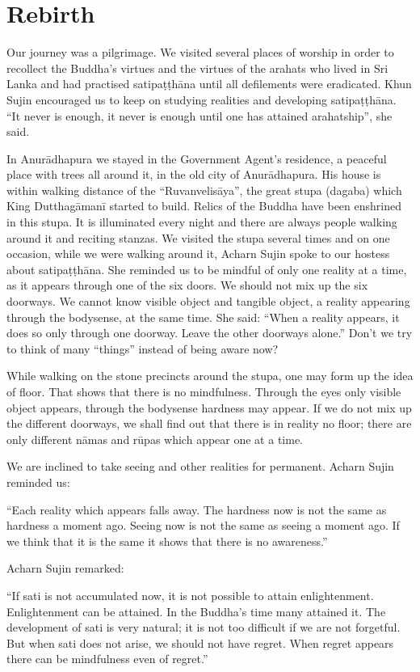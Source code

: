 \section*{Rebirth}

Our journey was a pilgrimage. We visited several places of worship in
order to recollect the Buddha's virtues and the virtues of the arahats
who lived in Sri Lanka and had practised satipaṭṭhāna until all
defilements were eradicated. Khun Sujin encouraged us to keep on
studying realities and developing satipaṭṭhāna. ``It never is enough, it
never is enough until one has attained arahatship'', she said.

In Anurādhapura we stayed in the Government Agent's residence, a
peaceful place with trees all around it, in the old city of
Anurādhapura. His house is within walking distance of the
``Ruvanvelisāya'', the great stupa (dagaba) which King Dutthagāmanī
started to build. Relics of the Buddha have been enshrined in this
stupa. It is illuminated every night and there are always people walking
around it and reciting stanzas. We visited the stupa several times and
on one occasion, while we were walking around it, Acharn Sujin spoke to
our hostess about satipaṭṭhāna. She reminded us to be mindful of only
one reality at a time, as it appears through one of the six doors. We
should not mix up the six doorways. We cannot know visible object and
tangible object, a reality appearing through the bodysense, at the same
time. She said: ``When a reality appears, it does so only through one
doorway. Leave the other doorways alone.'' Don't we try to think of many
``things'' instead of being aware now?

While walking on the stone precincts around the stupa, one may form up
the idea of floor. That shows that there is no mindfulness. Through the
eyes only visible object appears, through the bodysense hardness may
appear. If we do not mix up the different doorways, we shall find out
that there is in reality no floor; there are only different nāmas and
rūpas which appear one at a time.

We are inclined to take seeing and other realities for permanent. Acharn
Sujin reminded us:

``Each reality which appears falls away. The hardness now is not the
same as hardness a moment ago. Seeing now is not the same as seeing a
moment ago. If we think that it is the same it shows that there is no
awareness.''

Acharn Sujin remarked:

``If sati is not accumulated now, it is not possible to attain
enlightenment. Enlightenment can be attained. In the Buddha's time many
attained it. The development of sati is very natural; it is not too
difficult if we are not forgetful. But when sati does not arise, we
should not have regret. When regret appears there can be mindfulness
even of regret.''

